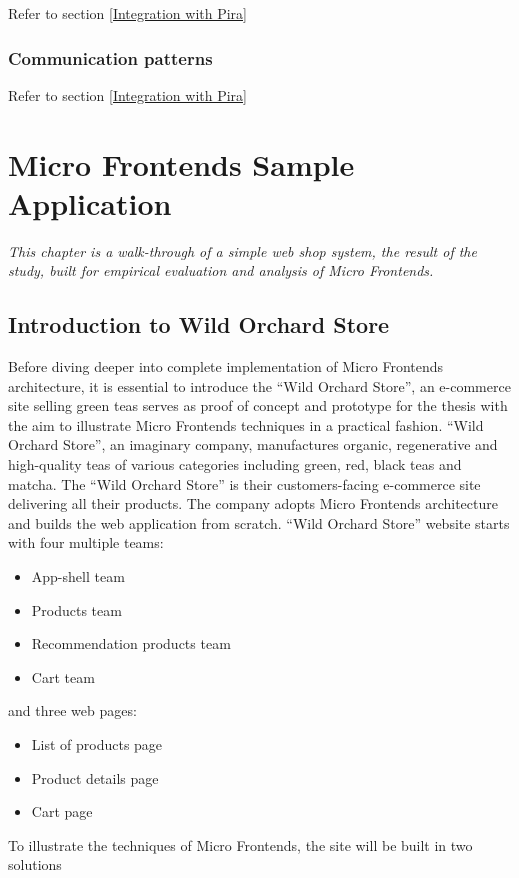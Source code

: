 \documentclass[a4paper]{book}
\begin{document}
Refer to section \ref{Integration with Pira}

\subsection{Communication patterns}

Refer to section \ref{Integration with Pira}

\chapter{Micro Frontends Sample Application} \label{Micro Frontends Sample Application}
\textit{This chapter is a walk-through of a simple web shop system, the result of the study, built for empirical evaluation and analysis of Micro Frontends.}
\section{Introduction to Wild Orchard Store}

Before diving deeper into complete implementation of Micro Frontends architecture, it is essential to introduce the “Wild Orchard Store”, an e-commerce site selling green teas serves as proof of concept and prototype for the thesis with the aim to illustrate Micro Frontends techniques in a practical fashion. “Wild Orchard Store”, an imaginary company, manufactures organic, regenerative and high-quality teas of various categories including green, red, black teas and matcha. The “Wild Orchard Store” is their customers-facing e-commerce site delivering all their products. 
The company adopts Micro Frontends architecture and builds the web application from scratch. “Wild Orchard Store” website starts with four multiple teams:

\begin{itemize}
    \item App-shell team
    \item Products team
    \item Recommendation products team
    \item Cart team
\end{itemize}
and three web pages:

\begin{itemize}
    \item List of products page
    \item Product details page
    \item Cart page
\end{itemize}
To illustrate the techniques of Micro Frontends, the site will be built in two solutions
\end{document}

